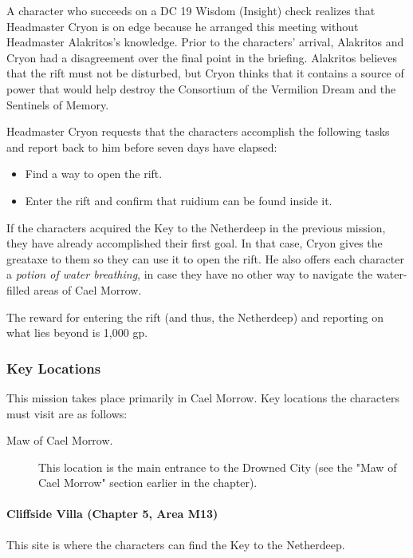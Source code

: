 \documentclass[letterpaper, 11pt, bg=full, twocolumn]{dndbook}
\begin{document}
A character who succeeds on a DC 19 Wisdom (Insight) check realizes that Headmaster Cryon is on edge because he arranged this meeting without Headmaster Alakritos's knowledge. Prior to the characters' arrival, Alakritos and Cryon had a disagreement over the final point in the briefing. Alakritos believes that the rift must not be disturbed, but Cryon thinks that it contains a source of power that would help destroy the Consortium of the Vermilion Dream and the Sentinels of Memory.

Headmaster Cryon requests that the characters accomplish the following tasks and report back to him before seven days have elapsed:

\begin{itemize}
\item Find a way to open the rift.
\item Enter the rift and confirm that ruidium can be found inside it.
\end{itemize}

If the characters acquired the Key to the Netherdeep in the previous mission, they have already accomplished their first goal. In that case, Cryon gives the greataxe to them so they can use it to open the rift. He also offers each character a \textit{potion of water breathing}, in case they have no other way to navigate the water-filled areas of Cael Morrow.

The reward for entering the rift (and thus, the Netherdeep) and reporting on what lies beyond is 1,000 gp.

\subsubsection{Key Locations}

This mission takes place primarily in Cael Morrow. Key locations the characters must visit are as follows:

\begin{description}
\item[Maw of Cael Morrow.] This location is the main entrance to the Drowned City (see the "Maw of Cael Morrow" section earlier in the chapter).
\end{description}

\paragraph{Cliffside Villa (Chapter 5, Area M13)}

This site is where the characters can find the Key to the Netherdeep.
\end{document}
